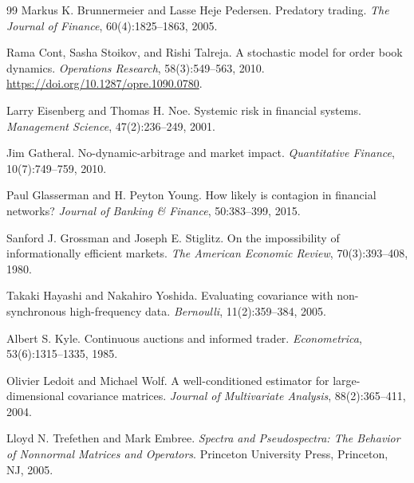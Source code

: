 \documentclass[10pt,twocolumn,letterpaper]{article}
\theoremstyle{definition}
\theoremstyle{remark}
\begin{document}
\begin{thebibliography}{99}
Markus K. Brunnermeier and Lasse Heje Pedersen.
\newblock Predatory trading.
\newblock \emph{The Journal of Finance}, 60(4):1825--1863, 2005.

Rama Cont, Sasha Stoikov, and Rishi Talreja.
\newblock A stochastic model for order book dynamics.
\newblock \emph{Operations Research}, 58(3):549--563, 2010.
\newblock \url{https://doi.org/10.1287/opre.1090.0780}.

Larry Eisenberg and Thomas H. Noe.
\newblock Systemic risk in financial systems.
\newblock \emph{Management Science}, 47(2):236--249, 2001.

Jim Gatheral.
\newblock No-dynamic-arbitrage and market impact.
\newblock \emph{Quantitative Finance}, 10(7):749--759, 2010.

Paul Glasserman and H. Peyton Young.
\newblock How likely is contagion in financial networks?
\newblock \emph{Journal of Banking \& Finance}, 50:383--399, 2015.

Sanford J. Grossman and Joseph E. Stiglitz.
\newblock On the impossibility of informationally efficient markets.
\newblock \emph{The American Economic Review}, 70(3):393--408, 1980.

Takaki Hayashi and Nakahiro Yoshida.
\newblock Evaluating covariance with non-synchronous high-frequency data.
\newblock \emph{Bernoulli}, 11(2):359--384, 2005.

Albert S. Kyle.
\newblock Continuous auctions and informed trader.
\newblock \emph{Econometrica}, 53(6):1315--1335, 1985.

Olivier Ledoit and Michael Wolf.
\newblock A well-conditioned estimator for large-dimensional covariance matrices.
\newblock \emph{Journal of Multivariate Analysis}, 88(2):365--411, 2004.

Lloyd N. Trefethen and Mark Embree.
\newblock \emph{Spectra and Pseudospectra: The Behavior of Nonnormal Matrices and Operators}.
\newblock Princeton University Press, Princeton, NJ, 2005.

\end{thebibliography}
\endgroup
\end{document}
